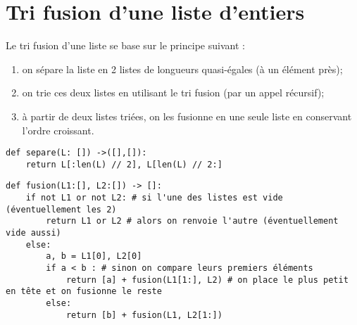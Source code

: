 \section*{Tri fusion d'une liste d'entiers}

Le tri fusion d'une liste se base sur le principe suivant : 
\begin{enumerate}
\item on sépare la liste en 2 listes de longueurs quasi-égales (à un élément près);
\item on trie ces deux listes en utilisant le tri fusion (par un appel récursif);
\item à partir de deux listes triées, on les fusionne en une seule liste en conservant l'ordre croissant.
\end{enumerate}

\ifprof
\begin{corrige}
\begin{lstlisting}
def separe(L: []) ->([],[]):
    return L[:len(L) // 2], L[len(L) // 2:]
\end{lstlisting}
\end{corrige}
\else
\fi

\ifprof
\begin{corrige}
\end{corrige}
\else
\fi


\ifprof
\begin{corrige}
\begin{lstlisting}
def fusion(L1:[], L2:[]) -> []:
    if not L1 or not L2: # si l'une des listes est vide (éventuellement les 2)
        return L1 or L2 # alors on renvoie l'autre (éventuellement vide aussi)
    else:
        a, b = L1[0], L2[0] 
        if a < b : # sinon on compare leurs premiers éléments
            return [a] + fusion(L1[1:], L2) # on place le plus petit en tête et on fusionne le reste
        else:
            return [b] + fusion(L1, L2[1:])
\end{lstlisting}
\end{corrige}
\else
\fi


